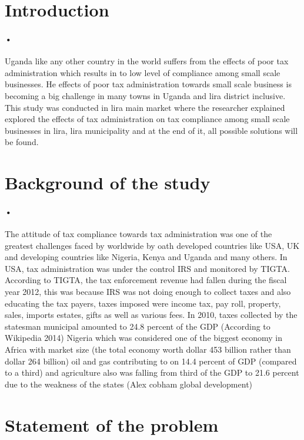 \documentclass[12pt]{article}
\begin{document}
\section{Introduction}

\paragraph{•}Uganda like any other country in the world suffers from the effects of poor tax administration which results in to low level of compliance among small scale businesses. He effects of poor tax administration towards small scale business is becoming a big challenge in many towns in Uganda and lira district inclusive. This study was conducted in lira main market where the researcher explained explored the effects of tax administration on tax compliance among small scale businesses in lira, lira municipality and at the end of it, all possible solutions will be found.

\section{Background of the study}
\paragraph{•}The attitude of tax compliance towards tax administration was one of the greatest challenges faced by worldwide by oath developed countries like USA, UK and developing countries like Nigeria, Kenya and Uganda and many others. In USA, tax administration was under the control IRS and monitored by TIGTA. According to TIGTA, the tax enforcement revenue had fallen during the fiscal year 2012, this was because IRS was not doing enough to collect taxes and also educating the tax payers, taxes imposed were income tax, pay roll, property, sales, imports estates, gifts as well as various fees. In 2010, taxes collected by the statesman municipal amounted to 24.8 percent of the GDP (According to Wikipedia 2014) Nigeria which was considered one of the biggest economy in Africa with market size (the total economy worth dollar 453 billion rather than dollar 264 billion) oil and gas contributing to on 14.4 percent of GDP (compared to a third) and agriculture also was falling from third of the GDP to 21.6 percent due to the weakness of the states (Alex cobham global development)  

\section{Statement of the problem }
\end{document}
